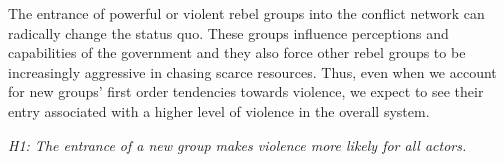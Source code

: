 The entrance of powerful or violent rebel groups into the conflict network can radically change the status quo. These groups influence perceptions and capabilities of the government and they also force other rebel groups to be increasingly aggressive in chasing scarce resources. Thus, even when we account for new groups' first order tendencies towards violence, we expect to see their entry associated with a higher level of violence in the overall system.

\emph{H1: The entrance of a new group makes violence more likely for all actors.}








